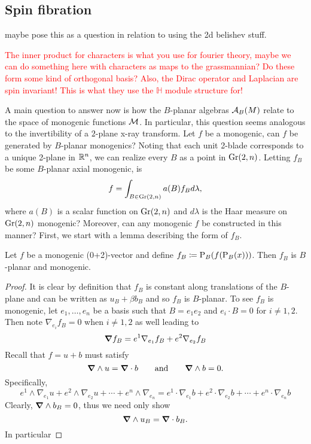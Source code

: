 \subsection{Spin fibration}
maybe pose this as a question in relation to using the 2d belishev stuff.

\textcolor{red}{The inner product for characters is what you use for fourier theory, maybe we can do something here with characters as maps to the grassmannian? Do these form some kind of orthogonal basis? Also, the Dirac operator and Laplacian are spin invariant! This is what they use the $\mathbb{H}$ module structure for!}

A main question to answer now is how the $B$-planar algebras $\mathcal{A}_{B}(M)$ relate to the space of monogenic functions $\mathcal{M}$.  In particular, this question seems analogous to the invertibility of a $2$-plane x-ray transform.  Let $f$ be a monogenic, can $f$ be generated by $B$-planar monogenics? Noting that each unit 2-blade corresponds to a unique 2-plane in $\mathbb{R}^n$, we can realize every $B$ as a point in $\operatorname{Gr}(2,n)$.  Letting $f_B$ be some $B$-planar axial monogenic, is
\[
f = \int_{B \in \operatorname{Gr}(2,n)} a(B) f_B d \lambda,
\]
where $a(B)$ is a scalar function on $\operatorname{Gr}(2,n)$ and $d\lambda$ is the Haar measure on $\operatorname{Gr}(2,n)$ monogenic? Moreover, can any monogenic $f$ be constructed in this manner? First, we start with a lemma describing the form of $f_B$.


\begin{lemma}
    Let $f$ be a monogenic (0+2)-vector and define $f_B \coloneqq \operatorname{P}_{B}(f(\operatorname{P}_{B}(x)))$. Then $f_B$ is $B$-planar and monogenic.  
\end{lemma}
\begin{proof}
    It is clear by definition that $f_B$ is constant along translations of the $B$-plane and can be written as $u_B+\beta b_B$ and so $f_B$ is $B$-planar.  To see $f_B$ is monogenic, let $e_1,\dots,e_n$ be a basis such that $B=e_1e_2$ and $e_i \cdot B = 0$ for $i\neq 1,2$. Then note $\nabla_{e_i} f_B =0$ when $i\neq 1,2$ as well leading to
    \[
        \boldsymbol{\nabla} f_B = e^1 \nabla_{e_1}f_B + e^2 \nabla_{e_2}f_B
    \]
    Recall that $f=u+b$ must satisfy
    \[
        \boldsymbol{\nabla} \wedge u = \boldsymbol{\nabla} \cdot b \qquad \textrm{and} \qquad \boldsymbol{\nabla} \wedge b = 0.
    \]
    Specifically,
    \[
        e^1 \wedge \nabla_{e_1} u + e^2 \wedge \nabla_{e_2}u + \cdots + e^n \wedge \nabla_{e_n} = e^1 \cdot \nabla_{e_1} b + e^2 \cdot \nabla_{e_2}b + \cdots + e^n \cdot \nabla_{e_n} b
    \]
    Clearly, $\boldsymbol{\nabla} \wedge b_B = 0$, thus we need only show
    \[
        \boldsymbol{\nabla} \wedge u_B = \boldsymbol{\nabla} \cdot b_B.
    \]
    In particular
\end{proof}


